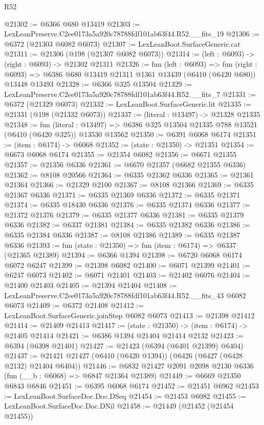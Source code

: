 \begin{lexlean}{R52}
\begin{coremodule}
@21302 := @6366 @680 @13419
@21303 := LexLeanPreserve.C2ee0173a5a920c78788fdf101ab63f44.R52.__fits_19
@21306 := @6372 (@21303 @6082 @6073)
@21307 := LexLeanBoot.SurfaceGeneric.cat
@21311 := @21306 (@198 (@21307 @6082 @6073))
@21314 := (left : @6093) -> (right : @6093) -> @21302 @21311
@21326 := fun (left : @6093) =>
  fun (right : @6093) => @6386 @680 @13419 @21311 @1361 @13439 (@6410 (@6420 @680)) @13448 @13493
@21328 := @6366 @325 @13504
@21329 := LexLeanPreserve.C2ee0173a5a920c78788fdf101ab63f44.R52.__fits_7
@21331 := @6372 (@21329 @6073)
@21332 := LexLeanBoot.SurfaceGeneric.lit
@21335 := @21331 (@198 (@21332 @6073))
@21337 := (literal : @13497) -> @21328 @21335
@21348 := fun (literal : @13497) =>
  @6386 @325 @13504 @21335 @788 @13521 (@6410 (@6420 @325)) @13530 @13562
@21350 := @6391 @6068 @6174
@21351 := (item : @6174) -> @6068
@21352 := (state : @21350) -> @21351
@21354 := @6673 @6068 @6174
@21355 := @21354 @6082
@21356 := @6671 @21355
@21357 := @21356 @6336
@21361 := @6670 @21357 (@6682 @21355 @6336)
@21362 := @8108 @20566
@21364 := @6335 @21362 @6336
@21365 := @21361 @21364
@21366 := @21329 @2100
@21367 := @8108 @21366
@21369 := @6335 @21367 @6336
@21371 := @6335 @21369 @6336
@21372 := @6335 @21371
@21374 := @6335 @18430 @6336
@21376 := @6335 @21374 @6336
@21377 := @21372 @21376
@21379 := @6335 @21377 @6336
@21381 := @6335 @21379 @6336
@21382 := @6337 @21381
@21384 := @6335 @21382 @6336
@21386 := @6335 @21384 @6336
@21387 := @8108 @21386
@21389 := @6335 @21387 @6336
@21393 := fun (state : @21350) => fun (item : @6174) => @6337 (@21365 @21389)
@21394 := @6366 @1394
@21398 := @6720 @6068 @6174 @6072 @6247
@21399 := @21398 @6082
@21400 := @6071 @21399
@21401 := @6247 @6073
@21402 := @6071 @21401
@21403 := @21402 @6076
@21404 := @21400 @21403
@21405 := @21394 @21404
@21408 := LexLeanPreserve.C2ee0173a5a920c78788fdf101ab63f44.R52.__fits_43 @6082 @6073
@21409 := @6372 @21408
@21412 := LexLeanBoot.SurfaceGeneric.joinStep @6082 @6073
@21413 := @21398 @21412
@21414 := @21409 @21413
@21417 := (state : @21350) -> (item : @6174) -> @21405 @21414
@21421 := @6386 @1394 @21404 @21414 @2132
@21423 := @6394 (@6398 @21401)
@21427 := @21423 (@6394 (@6401 @21399) @6404)
@21437 := @21421 @21427 (@6410 (@6420 @1394)) (@6426 (@6427 (@6428 @2132) @21404 @6404))
@21446 := @6832 @21427 @2091 @2098 @2130 @6336 (fun (__b : @6068) => @6847 @21364 @21389)
@21449 := @6669 @21350 @6843 @6846
@21451 := @6395 @6068 @6174
@21452 := @21451 @6962
@21453 := LexLeanBoot.SurfaceDoc.Doc.DSeq
@21454 := @21453 @6082
@21455 := LexLeanBoot.SurfaceDoc.Doc.DNil
@21458 := @21449 (@21452 (@21454 @21455))

\end{coremodule}
\end{lexlean}
